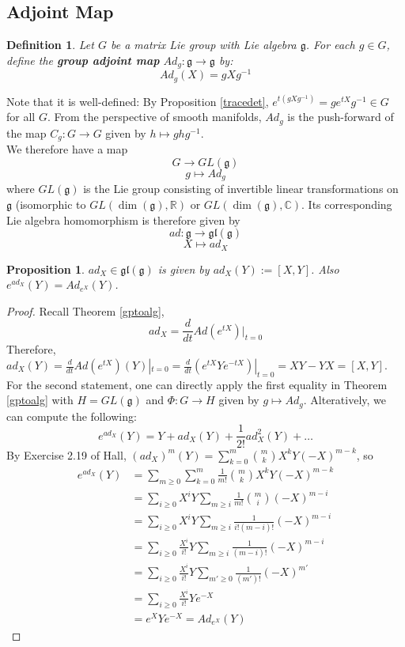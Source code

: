 \documentclass[11pt]{article}
\newtheorem{proposition}[theorem]{Proposition}
\newtheorem{definition}[theorem]{Definition}
\newcommand{\bb}[1]{\mathbb{#1}}
\newcommand{\mf}[1]{\mathfrak{#1}}
\begin{document}
\subsection{Adjoint Map}
\begin{definition}
Let $G$ be a matrix Lie group with Lie algebra $\mf{g}$. For each $g \in G$, define the \textbf{group adjoint map} $Ad_g: \mf{g} \to \mf{g}$ by:
$$Ad_g(X) = gXg^{-1}$$
\end{definition}
Note that it is well-defined: By Proposition \ref{tracedet}, $e^{t(gXg^{-1})} = ge^{tX}g^{-1} \in G$ for all $G$. From the perspective of smooth manifolds, $Ad_g$ is the push-forward of the map $C_g : G \to G$ given by $h \mapsto ghg^{-1}$.\\
We therefore have a map
$$G \to GL(\mf{g})$$
$$g \mapsto Ad_g$$
where $GL(\mf{g})$ is the Lie group consisting of invertible linear transformations on $\mf{g}$ (isomorphic to $GL(\dim(\mf{g}),\bb{R})$ or $GL(\dim(\mf{g}),\bb{C})$. Its corresponding Lie algebra homomorphism is therefore given by
$$ad: \mf{g} \to \mf{gl}(\mf{g})$$
$$X \mapsto ad_X$$
\begin{proposition}
$ad_X \in \mf{gl}(\mf{g})$ is given by $ad_X(Y) := [X,Y]$. Also $e^{ad_X}(Y) = Ad_{e^X}(Y)$.
\end{proposition}
\begin{proof}
Recall Theorem \ref{gptoalg},
$$ad_X = \frac{d}{dt}Ad(e^{tX})|_{t=0}$$
Therefore, $ad_X(Y) = \frac{d}{dt}Ad(e^{tX})(Y)|_{t=0} = \frac{d}{dt}(e^{tX}Ye^{-tX})|_{t=0} = XY - YX = [X,Y]$.\\

For the second statement, one can directly apply the first equality in Theorem \ref{gptoalg} with $H = GL(\mf{g})$ and $\Phi:G \to H$ given by $g \mapsto Ad_g$. Alteratively, we can compute the following:
$$e^{ad_X}(Y) = Y + ad_X(Y) + \frac{1}{2!} ad_{X}^2(Y) + \dots$$
By Exercise 2.19 of Hall, $(ad_X)^m(Y) = \sum_{k = 0}^{m} {m \choose k} X^kY(-X)^{m-k}$, so
\begin{align*}
e^{ad_X}(Y) &= \sum_{m \geq 0} \sum_{k = 0}^{m} \frac{1}{m!}{m \choose k} X^kY(-X)^{m-k}\\
& = \sum_{i \geq 0} X^iY \sum_{m \geq i} \frac{1}{m!}{m \choose i} (-X)^{m-i}\\
& = \sum_{i \geq 0} X^iY \sum_{m \geq i} \frac{1}{i!(m-i)!} (-X)^{m-i}\\
& = \sum_{i \geq 0} \frac{X^i}{i!} Y \sum_{m \geq i} \frac{1}{(m-i)!} (-X)^{m-i}\\
& = \sum_{i \geq 0} \frac{X^i}{i!} Y \sum_{m' \geq 0} \frac{1}{(m')!} (-X)^{m'}\\
& = \sum_{i \geq 0} \frac{X^i}{i!} Y e^{-X}\\
& = e^X Y e^{-X} = Ad_{e^X}(Y)
\end{align*}
\end{proof}
\end{document}
